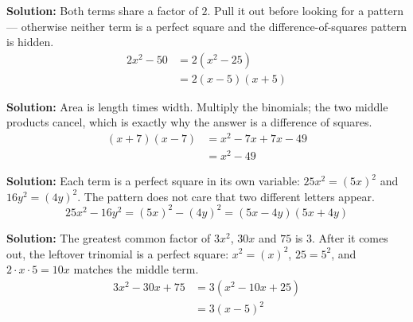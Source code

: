 \documentclass[12pt]{article}
\begin{document}
\textbf{Solution:} Both terms share a factor of $2$. Pull it out before looking for a pattern --- otherwise neither term is a perfect square and the difference-of-squares pattern is hidden.
\begin{align*}
  2x^2 - 50 &= 2(x^2 - 25) \\
            &= 2(x-5)(x+5)
\end{align*}


\textbf{Solution:} Area is length times width. Multiply the binomials; the two middle products cancel, which is exactly why the answer is a difference of squares.
\begin{align*}
  (x+7)(x-7) &= x^2 - 7x + 7x - 49 \\
             &= x^2 - 49
\end{align*}


\textbf{Solution:} Each term is a perfect square in its own variable: $25x^2 = (5x)^2$ and $16y^2 = (4y)^2$. The pattern does not care that two different letters appear.
\[ 25x^2 - 16y^2 = (5x)^2 - (4y)^2 = (5x-4y)(5x+4y) \]


\textbf{Solution:} The greatest common factor of $3x^2$, $30x$ and $75$ is $3$. After it comes out, the leftover trinomial is a perfect square: $x^2 = (x)^2$, $25 = 5^2$, and $2 \cdot x \cdot 5 = 10x$ matches the middle term.
\begin{align*}
  3x^2 - 30x + 75 &= 3(x^2 - 10x + 25) \\
                  &= 3(x-5)^2
\end{align*}

\end{document}
